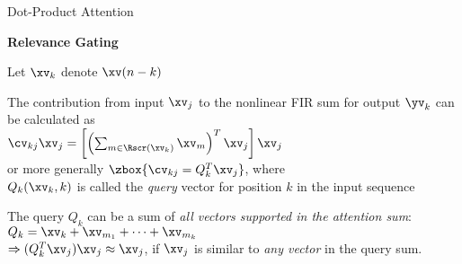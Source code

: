 \begin{slide}[\slideopts]{Dot-Product Attention}

\vspace{-2em}


\vspace{-2em}

\textbf{Relevance Gating}

Let $\xv_k$ denote $\xv(n-k)$

The contribution from input $\xv_j$ to the nonlinear FIR sum for output $\yv_k$ can be calculated as
\\
$
\cv_{kj}\xv_j = \left[\left(\sum_{m\in \Rscr(\xv_k)}\xv_m\right)^T \xv_j\right]\xv_j
$
\\
\maybepause
or more generally $\zbox{\cv_{kj} = Q_k^T \xv_j}$, where
\\
$Q_k(\xv_k,k)$ is called the \emph{query} vector for position $k$ in the input sequence

\vspace{1em}

\maybepause
The query $Q_k$ can be a sum of \emph{all vectors supported in the attention sum}:\\
$Q_k = \xv_k + \xv_{m_1} + \cdots + \xv_{m_k}$\\
$\Rightarrow (Q_k^T \xv_j)\xv_j \approx \xv_j$, if $\xv_j$ is similar to \emph{any vector} in the query sum.


\end{slide}



